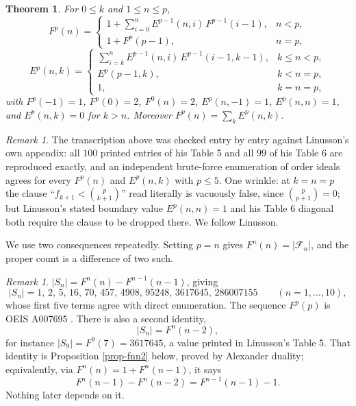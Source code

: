 \documentclass[11pt, a4paper, abstract=yes]{scrartcl}
\theoremstyle{definition}
\theoremstyle{remark}
\newtheorem{remark}[definition]{Remark}
\theoremstyle{plain}
\newtheorem{theorem}[definition]{Theorem}
\begin{document}
\begin{theorem}
\textcite[Theorem 5.2]{Linusson1999} For \(0\le k\) and \(1\le n\le p\),
\begin{equation}\label{eq:auto-8}
  F^p(n)=\begin{cases}
    1+\sum_{i=0}^{n}E^{p-1}(n,i)\,F^{p-1}(i-1), & n<p,\\
    1+F^p(p-1), & n=p,
  \end{cases}
\end{equation}
\begin{equation}\label{eq:auto-9}
  E^p(n,k)=\begin{cases}
    \sum_{i=k}^{n}E^{p-1}(n,i)\,E^{p-1}(i-1,k-1), & k\le n<p,\\
    E^p(p-1,k), & k<n=p,\\
    1, & k=n=p,
  \end{cases}
\end{equation}
with \(F^p(-1)=1\), \(F^p(0)=2\), \(F^0(n)=2\), \(E^p(n,-1)=1\), \(E^p(n,n)=1\), and
\(E^p(n,k)=0\) for \(k>n\). Moreover \(F^p(n)=\sum_kE^p(n,k)\).
\label{thm-linusson}
\end{theorem}

\begin{remark}
The transcription above was checked entry by entry against Linusson's own appendix: all \(100\)
printed entries of his Table 5 and all \(99\) of his Table 6 are reproduced exactly, and an
independent brute-force enumeration of order ideals agrees for every \(F^p(n)\) and
\(E^p(n,k)\) with \(p\le5\). One wrinkle: at \(k=n=p\) the clause
``\(f_{k+1}<\binom p{k+1}\)'' read literally is vacuously false, since \(\binom p{p+1}=0\); but
Linusson's stated boundary value \(E^p(n,n)=1\) and his Table 6 diagonal both require the clause to
be dropped there. We follow Linusson.
\label{rem-transcription}
\end{remark}

We use two consequences repeatedly. Setting \(p=n\) gives \(F^n(n)=|\mathcal F_n|\), and the
proper count is a difference of two such.

\begin{remark}
\(|S_n|=F^n(n)-F^{n-1}(n-1)\), giving
\begin{equation}\label{eq:auto-10}
  \lvert S_n\rvert = 1,\,2,\,5,\,16,\,70,\,457,\,4908,\,95248,\,3617645,\,286007155
  \qquad(n=1,\dots,10),
\end{equation}
whose first five terms agree with direct enumeration. The sequence \(F^p(p)\) is
OEIS A007695 \autocite{OEIS}. There is also a second identity,
\begin{equation}\label{eq:Sn-as-Fnn2}
  \lvert S_n\rvert=F^n(n-2),
\end{equation}
for instance \(|S_9|=F^9(7)=3617645\), a value printed in Linusson's Table 5. That identity is
Proposition \ref{prop-fnn2} below, proved by Alexander duality; equivalently, via
\(F^n(n)=1+F^n(n-1)\), it says
\begin{equation}\label{eq:Fnn2-equivalent}
  F^n(n-1)-F^n(n-2)=F^{n-1}(n-1)-1 .
\end{equation}
Nothing later depends on it.
\label{obs-fnn2}
\end{remark}
\end{document}
